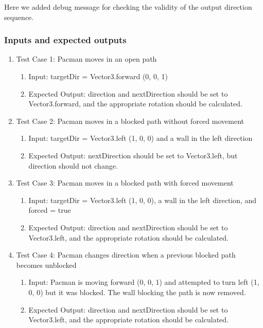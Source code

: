 \documentclass[11pt]{article}
\begin{document}
    Here we added debug message for checking the validity of the output direction sequence.
    
    \subsubsection*{Inputs and expected outputs}
    \begin{enumerate}
        \item Test Case 1: Pacman moves in an open path
        \begin{enumerate}
            \item Input: targetDir = Vector3.forward (0, 0, 1)
            \item Expected Output: direction and nextDirection should be set to Vector3.forward, and the appropriate rotation should be calculated.
        \end{enumerate}
        
        \item Test Case 2: Pacman moves in a blocked path without forced movement
        \begin{enumerate}
            \item Input: targetDir = Vector3.left (1, 0, 0) and a wall in the left direction
            \item Expected Output: nextDirection should be set to Vector3.left, but direction should not change.
        \end{enumerate}
        
        \item Test Case 3: Pacman moves in a blocked path with forced movement
        \begin{enumerate}
            \item Input: targetDir = Vector3.left (1, 0, 0), a wall in the left direction, and forced = true
            \item Expected Output: direction and nextDirection should be set to Vector3.left, and the appropriate rotation should be calculated.
        \end{enumerate}
        
        \item Test Case 4: Pacman changes direction when a previous blocked path becomes unblocked
        \begin{enumerate}
            \item Input: Pacman is moving forward (0, 0, 1) and attempted to turn left (1, 0, 0) but it was blocked. The wall blocking the path is now removed.
            \item Expected Output: direction and nextDirection should be set to Vector3.left, and the appropriate rotation should be calculated.
        \end{enumerate}
    \end{enumerate}
\end{document}
